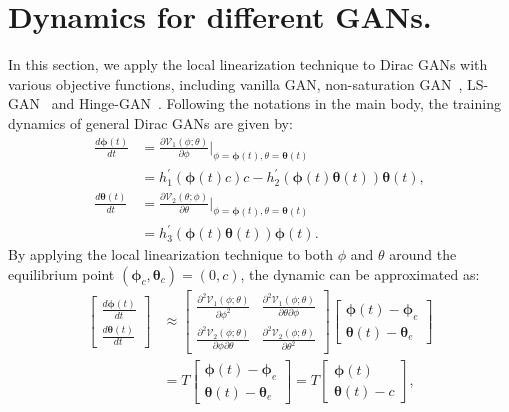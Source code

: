 \documentclass{article}
\newcommand{\uV}{\mathcal{V}}
\newcommand{\ttheta}{\bm{\theta}}
\newcommand{\tphi}{\bm{\phi}}
\theoremstyle{definition}
\begin{document}

 


\appendix

\section{Dynamics for different GANs.}



In this section, we apply the local linearization technique to Dirac GANs with various objective functions, including vanilla GAN, non-saturation GAN~\cite{goodfellow2014generative}, LS-GAN~\cite{mao2017least} and Hinge-GAN~\cite{miyato2018spectral}. Following the notations in the main body, the training dynamics of general Dirac GANs are given by:
\begin{align}
    \frac{d\tphi(t)}{dt} &= \frac{\partial \uV_1(\phi;\theta)}{\partial \phi}|_{\phi=\tphi(t), \theta=\ttheta(t)} \\
    & = h_1^\prime(\tphi(t) c)c - h_2^\prime(\tphi(t)\ttheta(t))\ttheta(t), \\
    \frac{d\ttheta(t)}{dt} &= \frac{\partial \uV_2(\theta;\phi)}{\partial \theta}|_{\phi=\tphi(t), \theta=\ttheta(t)} \\
     &= h_3^\prime(\tphi(t)\ttheta(t))\tphi(t).
\end{align}
By applying the local linearization technique to both $\phi$ and $\theta$ around the equilibrium point $(\tphi_c, \ttheta_c) = (0, c)$, the dynamic can be approximated as:
\begin{align}
    \begin{bmatrix} \frac{d\tphi(t)}{dt} \\ \frac{d\ttheta(t)}{dt} \end{bmatrix} &\approx  \begin{bmatrix}\frac{\partial^2 \uV_1(\phi;\theta)}{\partial\phi^2} & \frac{\partial^2 \uV_1(\phi;\theta)}{\partial \theta\partial \phi} \\
    \frac{\partial^2 \uV_2(\phi;\theta)}{\partial \phi\partial\theta} & \frac{\partial^2 \uV_2(\phi;\theta)}{\partial\theta^2}
    \end{bmatrix}\begin{bmatrix}\tphi(t) - \tphi_e \\ \ttheta(t) - \ttheta_e\end{bmatrix} \\
    &= T \begin{bmatrix}\tphi(t) - \tphi_e \\ \ttheta(t) - \ttheta_e\end{bmatrix} = T \begin{bmatrix}\tphi(t)\\ \ttheta(t) - c\end{bmatrix},
\end{align}
\end{document}
